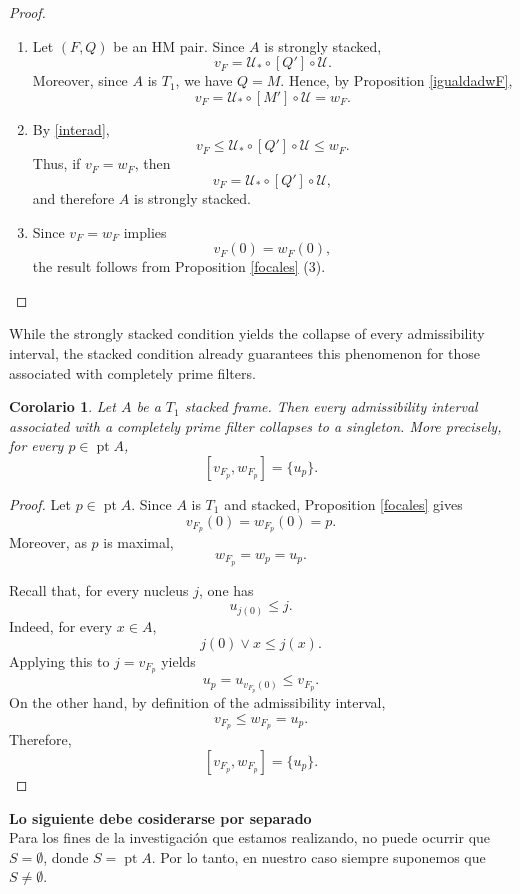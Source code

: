 \documentclass[11pt]{amsart}
\DeclareMathOperator{\pt}{pt}
\theoremstyle{plain}
\newtheorem{cor}[thm]{Corolario}
\theoremstyle{definition}
\begin{document}
\begin{proof}
\mbox{}
\begin{enumerate}
	\item Let $(F,Q)$ be an HM pair. Since $A$ is strongly stacked,
\[
v_F=\mathcal{U}_*\circ[Q']\circ\mathcal{U}.
\]
Moreover, since $A$ is $T_1$, we have $Q=M$. Hence, by Proposition \ref{igualdadwF},
\[
v_F
=\mathcal{U}_*\circ[M']\circ\mathcal{U}
=w_F.
\]

\item By \eqref{interad},
\[
v_F
\leq
\mathcal{U}_*\circ[Q']\circ\mathcal{U}
\leq
w_F.
\]
Thus, if $v_F=w_F$, then
\[
v_F=\mathcal{U}_*\circ[Q']\circ\mathcal{U},
\]
and therefore $A$ is strongly stacked.

\item Since $v_F=w_F$ implies
\[
v_F(0)=w_F(0),
\]
the result follows from Proposition \ref{focales} (3).
\end{enumerate}
\end{proof}

While the strongly stacked condition yields the collapse of every
admissibility interval, the stacked condition already guarantees this
phenomenon for those associated with completely prime filters.

\begin{cor}\label{Igualdadnucleos}
Let $A$ be a $T_1$ stacked frame. Then every admissibility interval
associated with a completely prime filter collapses to a singleton. More
precisely, for every $p\in\pt A$,
\[
[v_{F_p},w_{F_p}]=\{u_p\}.
\]
\end{cor}

\begin{proof}
Let $p\in\pt A$. Since $A$ is $T_1$ and stacked, Proposition \ref{focales} gives
\[
v_{F_p}(0)=w_{F_p}(0)=p.
\]
Moreover, as $p$ is maximal,
\[
w_{F_p}=w_p=u_p.
\]

Recall that, for every nucleus $j$, one has
\[
u_{j(0)}\leq j.
\]
Indeed, for every $x\in A$,
\[
j(0)\vee x\leq j(x).
\]
Applying this to $j=v_{F_p}$ yields
\[
u_p=u_{v_{F_p}(0)}\leq v_{F_p}.
\]
On the other hand, by definition of the admissibility interval,
\[
v_{F_p}\leq w_{F_p}=u_p.
\]
Therefore,
\[
[v_{F_p},w_{F_p}]=\{u_p\}.
\]
\end{proof}


\textbf{Lo siguiente debe cosiderarse por separado}\\

Para los fines de la investigación que estamos realizando, no puede ocurrir que $S=\emptyset$, donde $S=\pt A$.
Por lo tanto, en nuestro caso siempre suponemos que $S\neq \emptyset$.\\
\end{document}
